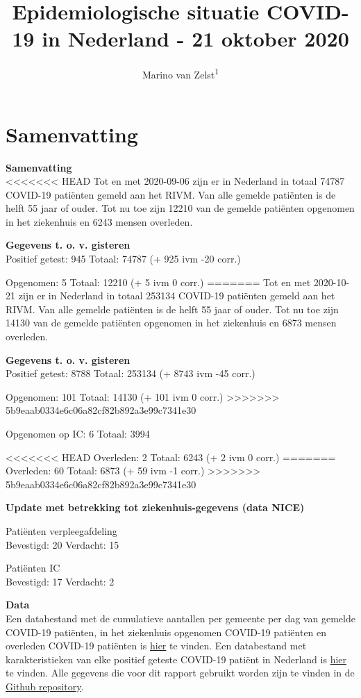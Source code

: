 \documentclass[
  english,
  man,floatsintext]{apa6}
\title{Epidemiologische situatie COVID-19 in Nederland - 21 oktober 2020}
\author{Marino van Zelst\textsuperscript{1}}
\date{}
\affiliation{\vspace{0.5cm}\textsuperscript{1} Vragen over deze rapportage kunnen verstuurd worden aan Marino van Zelst, twitter.com/mzelst. E-mail: \href{mailto:j.m.vanzelst@uvt.nl}{\nolinkurl{j.m.vanzelst@uvt.nl}}}
\begin{document}
\maketitle

{
\hypersetup{linkcolor=}
\setcounter{tocdepth}{3}
\tableofcontents
}
\newpage

\hypertarget{samenvatting}{%
\section{Samenvatting}\label{samenvatting}}

\textbf{Samenvatting}\\
<<<<<<< HEAD
Tot en met 2020-09-06 zijn er in Nederland in totaal 74787 COVID-19 patiënten gemeld aan het RIVM. Van alle gemelde patiënten is de helft 55 jaar of ouder. Tot nu toe zijn 12210 van de gemelde patiënten opgenomen in het ziekenhuis en 6243 mensen overleden.

\textbf{Gegevens t. o. v. gisteren}\\
Positief getest: 945
Totaal: 74787 (+ 925 ivm -20 corr.)

Opgenomen: 5
Totaal: 12210 (+
5 ivm 0 corr.)
=======
Tot en met 2020-10-21 zijn er in Nederland in totaal 253134 COVID-19 patiënten gemeld aan het RIVM. Van alle gemelde patiënten is de helft 55 jaar of ouder. Tot nu toe zijn 14130 van de gemelde patiënten opgenomen in het ziekenhuis en 6873 mensen overleden.

\textbf{Gegevens t. o. v. gisteren}\\
Positief getest: 8788
Totaal: 253134 (+ 8743 ivm -45 corr.)

Opgenomen: 101
Totaal: 14130 (+
101 ivm 0 corr.)
>>>>>>> 5b9eaab0334e6c06a82cf82b892a3e99c7341e30

Opgenomen op IC: 6
Totaal: 3994

<<<<<<< HEAD
Overleden: 2
Totaal: 6243 (+
2 ivm 0 corr.)
=======
Overleden: 60
Totaal: 6873 (+
59 ivm -1 corr.)
>>>>>>> 5b9eaab0334e6c06a82cf82b892a3e99c7341e30

\textbf{Update met betrekking tot ziekenhuis-gegevens (data NICE)}

Patiënten verpleegafdeling\\
Bevestigd: 20 Verdacht: 15

Patiënten IC\\
Bevestigd: 17 Verdacht: 2

\textbf{Data}\\
Een databestand met de cumulatieve aantallen per gemeente per dag van gemelde COVID-19 patiënten, in het ziekenhuis opgenomen COVID-19 patiënten en overleden COVID-19 patiënten is \href{https://data.rivm.nl/geonetwork/srv/dut/catalog.search\#/metadata/1c0fcd57-1102-4620-9cfa-441e93ea5604}{hier} te vinden. Een databestand met karakteristieken van elke positief geteste COVID-19 patiënt in Nederland is \href{https://data.rivm.nl/geonetwork/srv/dut/catalog.search\#/metadata/2c4357c8-76e4-4662-9574-1deb8a73f724?tab=relations}{hier} te vinden. Alle gegevens die voor dit rapport gebruikt worden zijn te vinden in de \href{https://github.com/mzelst/covid-19}{Github repository}.
\end{document}
